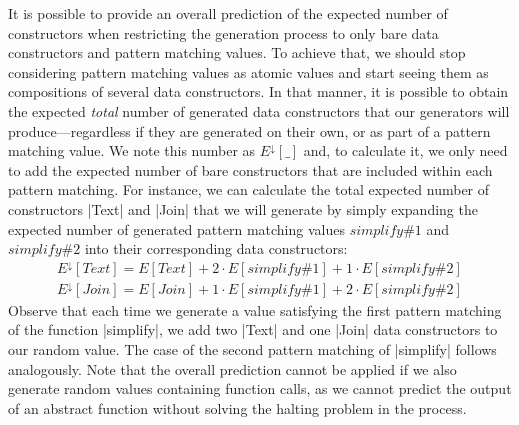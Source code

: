 It is possible to provide an overall prediction of the expected number of
constructors when restricting the generation process to only bare data
constructors and pattern matching values.
%
To achieve that, we should stop considering pattern matching values as atomic
values and start seeing them as compositions of several data constructors.
%
In that manner, it is possible to obtain the expected \emph{total} number of
generated data constructors that our generators will produce---regardless if they
are generated on their own, or as part of a pattern matching value.
%
We note this number as $E^\downarrow\![\_]$ and, to calculate it, we only need
to add the expected number of bare constructors that are included within each
pattern matching.
%
For instance, we can calculate the total expected number of constructors |Text|
and |Join| that we will generate by simply expanding the expected number of
generated pattern matching values $simplify\#1$ and $simplify\#2$ into their
corresponding data constructors:
%
{\small
  \begin{align*}
    E^\downarrow\!\!\left[ Text \right]
    = E\left[ Text \right]
    + 2\! \cdot\!\! E\!\left[ simplify\#1 \right]
    + 1\!\! \cdot\!\! E\!\left[ simplify\#2 \right] \\
    E^\downarrow\!\!\left[ Join \right]
    = E\left[ Join \right]
    + 1\!\! \cdot\!\! E\!\left[ simplify\#1 \right]
    + 2\! \cdot\!\! E\!\left[ simplify\#2 \right]
  \end{align*}
}
%
Observe that each time we generate a value satisfying the first pattern matching
of the function |simplify|, we add two |Text| and one |Join| data constructors
to our random value.
%
The case of the second pattern matching of |simplify| follows analogously.
%
Note that the overall prediction cannot be applied if we also generate random
values containing function calls, as we cannot predict the output of an abstract
function without solving the halting problem in the process.


